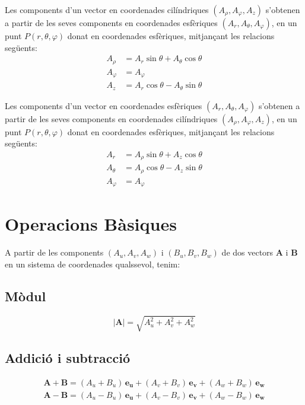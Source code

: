 \documentclass[catalan,a4paper,twoside,11pt]{article}
\begin{document}
Les components d'un vector en coordenades cilíndriques  $(A_\rho, A_\varphi, A_z)$ s'obtenen a partir de les seves components en coordenades esfèriques $(A_r, A_\theta, A_\varphi)$, en un punt $P(r,\theta,\varphi)$ donat en coordenades esfèriques, mitjançant les relacions següents:
\begin{subequations}\begin{align}
    A_\rho &= A_r\sin\theta+A_\theta\cos\theta \\
    A_\varphi &= A_\varphi\\
    A_z &= A_r\cos\theta-A_\theta\sin\theta
\end{align}\end{subequations}

Les components d'un vector en coordenades esfèriques $(A_r, A_\theta, A_\varphi)$ s'obtenen a partir de les seves components en coordenades cilíndriques $(A_\rho, A_\varphi, A_z)$, en un punt $P(r,\theta,\varphi)$ donat en coordenades esfèriques, mitjançant les relacions següents:
\begin{subequations}\begin{align}
    A_r &=  A_\rho\sin\theta+A_z\cos\theta\\
    A_\theta &=  A_\rho\cos\theta-A_z\sin\theta\\
    A_\varphi &= A_\varphi
\end{align}\end{subequations}


\section{Operacions  Bàsiques}
\renewcommand{\va}{\ensuremath{\,\boldsymbol{e_u}}}
\renewcommand{\vb}{\ensuremath{\,\boldsymbol{e_v}}}
\renewcommand{\vc}{\ensuremath{\,\boldsymbol{e_w}}}

A partir de les components $(A_u,A_v,A_w)$ i $(B_u,B_v,B_w)$
de dos vectors $\boldsymbol{A}$ i $\boldsymbol{B}$ en un sistema de coordenades qualssevol, tenim:

\subsection{Mòdul}
\vspace{-5mm}
\begin{equation}
    |\boldsymbol{A}|=  \sqrt{A_u^2 + A_v^2 + A_w^2}
\end{equation}

\subsection{Addició i subtracció}
\vspace{-5mm}
\begin{subequations}\begin{align}
    \boldsymbol{A+B}= (A_u+B_u)\va + (A_v+B_v)\vb + (A_w+B_w)\vc \\
    \boldsymbol{A-B}= (A_u-B_u)\va + (A_v-B_v)\vb + (A_w-B_w)\vc
\end{align}\end{subequations}
\end{document}
